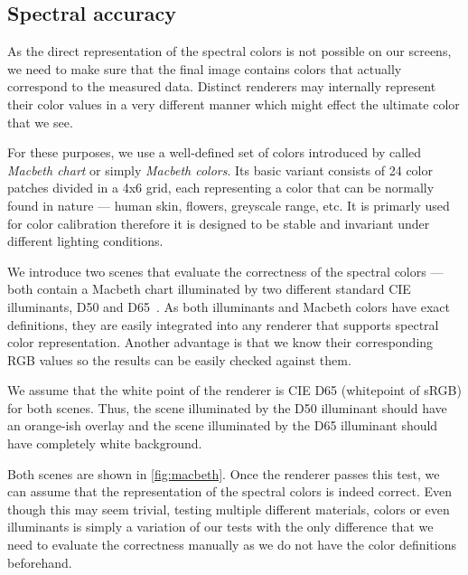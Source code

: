 \subsection{Spectral accuracy}

As the direct representation of the spectral colors is not possible on our screens, we need to make sure that the final image contains colors that actually correspond to the measured data. Distinct renderers may internally represent their color values in a very different manner which might effect the ultimate color that we see.

For these purposes, we use a well-defined set of colors introduced by \citet{mccamy1976color} called \emph{Macbeth chart} or simply \emph{Macbeth colors}. Its basic variant consists of 24 color patches divided in a 4x6 grid, each representing a color that can be normally found in nature --- human skin, flowers, greyscale range, etc. It is primarly used for color calibration therefore it is designed to be stable and invariant under different lighting conditions.

We introduce two scenes that evaluate the correctness of the spectral colors --- both contain a Macbeth chart illuminated by two different standard CIE illuminants, D50 and D65~\cite{cieIlluminants}. As both illuminants and Macbeth colors have exact definitions, they are easily integrated into any renderer that supports spectral color representation. Another advantage is that we know their corresponding RGB values so the results can be easily checked against them.

We assume that the white point of the renderer is CIE D65 (whitepoint of sRGB) for both scenes. Thus, the scene illuminated by the D50 illuminant should have an orange-ish overlay and the scene illuminated by the D65 illuminant should have completely white background.

Both scenes are shown in \autoref{fig:macbeth}. Once the renderer passes this test, we can assume that the representation of the spectral colors is indeed correct. Even though this may seem trivial, testing multiple different materials, colors or even illuminants is simply a variation of our tests with the only difference that we need to evaluate the correctness manually as we do not have the color definitions beforehand.

